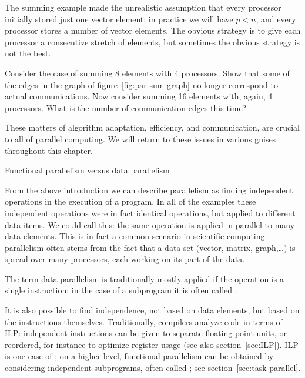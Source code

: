 The summing example made the unrealistic assumption that every
processor initially stored just one vector element: in practice we will
have $p<n$, and every processor stores a number of vector
elements. The obvious strategy is to give each processor a consecutive
stretch of elements, but sometimes the obvious strategy is not the
best.

\begin{exercise}
  Consider the case of summing 8 elements with 4 processors. Show that
  some of the edges in the graph of figure~\ref{fig:par-sum-graph} no
  longer correspond to actual communications. 
  Now consider summing 16 elements with, again, 4 processors. What is
  the number of communication edges this time?
\end{exercise}

These matters of algorithm adaptation, efficiency, and communication,
are crucial to all of parallel computing. We will return to these
issues in various guises throughout this chapter.

 {Functional parallelism versus data parallelism}

From the above introduction we can describe parallelism as finding
independent operations in the execution of a program. In all of the examples
these independent operations were in fact identical operations, but applied to
different data items. We could call this: the same
operation is applied in parallel to many data elements.
This is in fact a common scenario in scientific computing: parallelism
often stems from the fact that a data set (vector, matrix,
graph,\ldots) is spread over many processors, each working on its part
of the data. 

The term data parallelism is traditionally mostly applied
if the operation is a single instruction; in the case of a subprogram
it is often called .

It is also possible to find independence, not based on data elements,
but based on the instructions themselves. Traditionally, compilers
analyze code in terms of \ac{ILP}: independent instructions can be given
to separate floating point units, or reordered, for instance to optimize
register usage (see also section~\ref{sec:ILP}).
\ac{ILP} is one case of ;
on a higher level, functional parallelism can be obtained
by considering independent subprograms, often called ;
see section~\ref{sec:task-parallel}.

